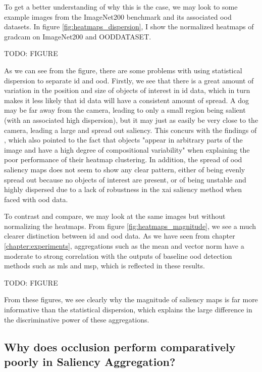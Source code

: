 \documentclass[UKenglish]{uiomasterthesis} %
\theoremstyle{definition}
\begin{document}
To get a better understanding of why this is the case, we may look to some example images from the ImageNet200 benchmark and its associated \ac{ood} datasets. In figure \ref{fig:heatmaps_dispersion}, I show the normalized heatmaps of \ac{gradcam} on ImageNet200 and OODDATASET.

TODO: FIGURE

As we can see from the figure, there are some problems with using statistical dispersion to separate \ac{id} and \ac{ood}. Firstly, we see that there is a great amount of variation in the position and size of objects of interest in \ac{id} data, which in turn makes it less likely that \ac{id} data will have a consistent amount of spread. A dog may be far away from the camera, leading to only a small region being salient (with an associated high dispersion), but it may just as easily be very close to the camera, leading a large and spread out saliency. This concurs with the findings of \cite{martinez}, which also pointed to the fact that objects "appear in arbitrary parts of the image and have a high degree of compositional variability" when explaining the poor performance of their heatmap clustering. In addition, the spread of \ac{ood} saliency maps does not seem to show any clear pattern, either of being evenly spread out because no objects of interest are present, or of being unstable and highly dispersed due to a lack of robustness in the \ac{xai} saliency method when faced with \ac{ood} data.

To contrast and compare, we may look at the same images but without normalizing the heatmaps. From figure \ref{fig:heatmaps_magnitude}, we see a much clearer distinction between \ac{id} and \ac{ood} data. As we have seen from chapter \ref{chapter:experiments}, aggregations such as the mean and vector norm have a moderate to strong correlation with the outputs of baseline \ac{ood} detection methods such as \ac{mls} and \ac{msp}, which is reflected in these results.

TODO: FIGURE

From these figures, we see clearly why the magnitude of saliency maps is far more informative than the statistical dispersion, which explains the large difference in the discriminative power of these aggregations.

\subsection{Why does occlusion perform comparatively poorly in Saliency Aggregation?}
\end{document}
